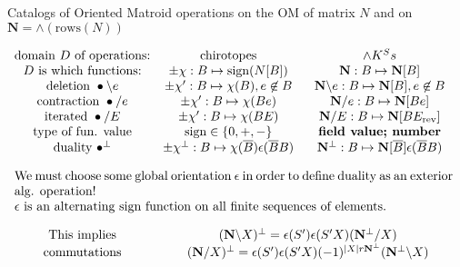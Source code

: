 \documentclass{beamer}
\newcommand{\FieldK}{\ensuremath{K}}
\newcommand{\ext}[1]{\ensuremath{\mathbf{#1}}}
\begin{document}
\begin{frame}{Catalogs of Oriented Matroid operations on the OM of matrix $N$ and on
    $\ext{N}=\wedge(\text{rows}(N))$}

\hspace*{-0.35in}$
    \begin{array}{ccc}
\text{domain $D$ of operations:} &  \text{chirotopes}            & \ext{\wedge} \FieldK^Ss \\
\text{$D$ is which functions:}                & \pm\chi:B\mapsto\text{sign}(N[B]) & \ext{N}:B\mapsto\ext{N}[B] \\
\text{deletion\ } \bullet\backslash e  & \pm\chi':B\mapsto\chi(B),e\not\in B & \ext{N}\backslash e:B\mapsto\ext{N}[B], e\not\in B \\
\text{contraction\ }\bullet / e              & \pm\chi':B\mapsto\chi(Be) & \ext{N}/e:B\mapsto\ext{N}[Be] \\
\text{iterated\ }\bullet / E              & \pm\chi':B\mapsto\chi(BE) & \ext{N}/E:B\mapsto\ext{N}[BE_{\text{rev}}] \\
\text{type of fun. value}                   & \text{sign}\in\{0,+,-\} &  \text{\bf field value; number}\\

\text{duality\ }\bullet^{\perp} & \pm\chi^{\perp}:B\mapsto\chi(\overline{B})\epsilon(\overline{B}B) &
\ext{N}^{\perp}:B\mapsto\ext{N}[\overline{B}]\epsilon(\overline{B}B) \\ \\
\multicolumn{3}{c}{\parbox{\textwidth}{We must choose some global orientation $\epsilon$ in order to define duality as an exterior alg. operation!
    \\
    $\epsilon$ is an alternating sign function on all finite sequences of elements. }}\\ \\ 
\text{This implies} & \multicolumn{2}{c}{(\ext{N}\backslash X)^\perp = \epsilon(S')\epsilon(S'X)(\ext{N}^\perp/X)}  \\
\text{commutations} & \multicolumn{2}{c}{(\ext{N}/X)^\perp = \epsilon(S')\epsilon(S'X)(-1)^{|X|r\ext{N}^\perp}(\ext{N}^\perp\backslash X)}\\

    \end{array}
    $
\end{frame}
\end{document}
